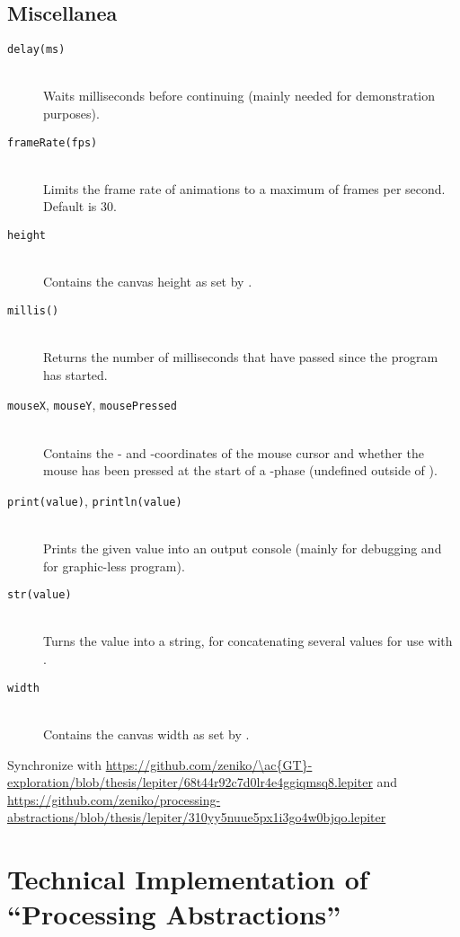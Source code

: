 \section{Miscellanea}
\begin{description}
\item[\texttt{delay(ms)}] \hfill \\
	Waits  milliseconds before continuing (mainly needed for demonstration purposes).
\item[\texttt{frameRate(fps)}] \hfill \\
	Limits the frame rate of animations to a maximum of  frames per second. Default is 30.
\item[\texttt{height}] \hfill \\
	Contains the canvas height as set by .
\item[\texttt{millis()}] \hfill \\
	Returns the number of milliseconds that have passed since the program has started.
\item[\texttt{mouseX}, \texttt{mouseY}, \texttt{mousePressed}] \hfill \\
	Contains the - and -coordinates of the mouse cursor and whether the mouse has been pressed at the start of a -phase (undefined outside of ).
\item[\texttt{print(value)}, \texttt{println(value)}] \hfill \\
	Prints the given value into an output console (mainly for debugging and for graphic-less program).
\item[\texttt{str(value)}] \hfill \\
	Turns the value into a string, \eg for concatenating several values for use with .
\item[\texttt{width}] \hfill \\
	Contains the canvas width as set by .
\end{description}

\begin{todo}
\item Synchronize with \url{https://github.com/zeniko/\ac{GT}-exploration/blob/thesis/lepiter/68t44r92c7d0lr4e4ggiqmsq8.lepiter} and \url{https://github.com/zeniko/processing-abstractions/blob/thesis/lepiter/310yy5nuue5px1i3go4w0bjqo.lepiter}
\end{todo}




\chapter{Technical Implementation of ``Processing Abstractions''} \label{app_implementation}

